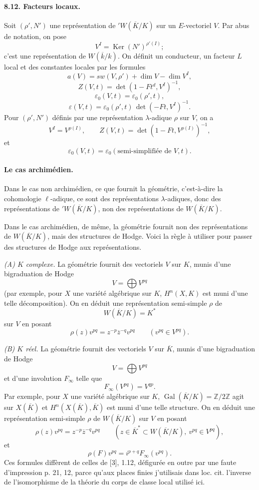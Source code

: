 \documentclass[10pt]{article}
\newcommand{\Z}{\mathbb Z}
\newcommand{\Gal}{\operatorname{Gal}}
\providecommand{\Ker}{\operatorname{Ker}}
\providecommand{\Gal}{\operatorname{Gal}}
\providecommand{\Gal}{\operatorname{Gal}}
\providecommand{\Gal}{\operatorname{Gal}}
\providecommand{\Gal}{\operatorname{Gal}}
\providecommand{\Ker}{\operatorname{Ker}}
\begin{document}
\paragraph{8.12. Facteurs locaux.} Soit $(\rho',N')$ une représentation de ${}'W(\overline K/K)$ sur un $E$-vectoriel $V$. Par abus de notation, on pose
\[
V^I=\Ker(N')^{\rho'(I)};
\]
c'est une représentation de $W(\overline k/k)$. On définit un conducteur, un facteur $L$ local et des constantes locales par les formules
\[
\tag{8.12.1}
a(V)=sw(V,\rho')+\dim V-\dim V^I,
\]
\[
\tag{8.12.2}
Z(V,t)=\det(1-Ft^d,V^I)^{-1},
\]
\[
\tag{8.12.3}
\varepsilon_0(V,t)=\varepsilon_0(\rho',t),
\]
\[
\tag{8.12.4}
\varepsilon(V,t)=\varepsilon_0(\rho',t)\,\det(-Ft,V^I)^{-1}.
\]
Pour $(\rho',N')$ définis par une représentation $\lambda$-adique $\rho$ sur $V$, on a
\[
V^I=V^{\rho(I)},
\qquad
Z(V,t)=\det(1-Ft,V^{\rho(I)})^{-1},
\]
et
\[
\varepsilon_0(V,t)=\varepsilon_0(\text{semi-simplifiée de }V,t).
\]

\paragraph{Le cas archimédien.} Dans le cas non archimédien, ce que fournit la géométrie, c'est-à-dire la cohomologie $\ell$-adique, ce sont des représentations $\lambda$-adiques, donc des représentations de ${}'W(\overline K/K)$, non des représentations de $W(\overline K/K)$.

Dans le cas archimédien, de même, la géométrie fournit non des représentations de $W(\overline K/K)$, mais des structures de Hodge. Voici la règle à utiliser pour passer des structures de Hodge aux représentations.

\emph{(A) $K$ complexe.} La géométrie fournit des vectoriels $V$ sur $K$, munis d'une bigraduation de Hodge
\[
V=\bigoplus V^{pq}
\]
(par exemple, pour $X$ une variété algébrique sur $K$, $H^n(X,K)$ est muni d'une telle décomposition). On en déduit une représentation semi-simple $\rho$ de
\[
W(\overline K/K)=K^*
\]
sur $V$ en posant
\[
\rho(z)v^{pq}=z^{-p}\overline z^{-q}v^{pq}\qquad(v^{pq}\in V^{pq}).
\]

\emph{(B) $K$ réel.} La géométrie fournit des vectoriels $V$ sur $\overline K$, munis d'une bigraduation de Hodge
\[
V=\bigoplus V^{pq}
\]
et d'une involution $F_\infty$ telle que
\[
F_\infty(V^{pq})=V^{qp}.
\]
Par exemple, pour $X$ une variété algébrique sur $K$, $\Gal(\overline K/K)=\Z/2\Z$ agit sur $X(\overline K)$ et $H^n(X(\overline K),\overline K)$ est muni d'une telle structure. On en déduit une représentation semi-simple $\rho$ de $W(\overline K/K)$ sur $V$ en posant
\[
\rho(z)v^{pq}=z^{-p}\overline z^{-q}v^{pq}\qquad(z\in\overline K^*\subset W(\overline K/K),\ v^{pq}\in V^{pq}),
\]
et
\[
\rho(F)v^{pq}=i^{p+q}F_\infty(v^{pq}).
\]
Ces formules diffèrent de celles de [3], 1.12, défigurée en outre par une faute d'impression p. 21, 12, parce qu'aux places finies j'utilisais dans loc. cit. l'inverse de l'isomorphisme de la théorie du corps de classe local utilisé ici.
\end{document}
